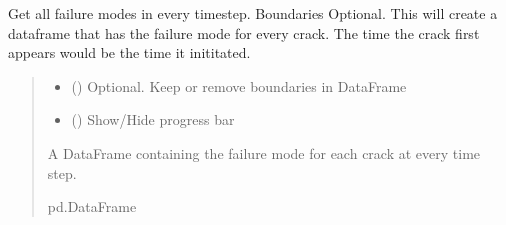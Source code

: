 \documentclass[letterpaper,10pt,english]{sphinxmanual}
\begin{document}
\begin{fulllineitems}
\begin{fulllineitems}
\begin{quote}
\begin{description}
\end{description}\end{quote}

\end{fulllineitems}


\begin{fulllineitems}
\label{\detokenize{pyfdempp:pyfdempp.pyfdempp.Model.crack_failure_mode}}
\pysigstartsignatures
{}
\pysigstopsignatures
\sphinxAtStartPar
Get all failure modes in every timestep. Boundaries Optional.
This will create a dataframe that has the failure mode for every crack. The time the crack first appears would be the time it inititated.
\begin{quote}\begin{description}
\begin{itemize}
\item {} 
\sphinxAtStartPar
{} () \textendash{} Optional. Keep or remove boundaries in DataFrame

\item {} 
\sphinxAtStartPar
{} () \textendash{} Show/Hide progress bar

\end{itemize}

\sphinxAtStartPar
A DataFrame containing the failure mode for each crack at every time step.

\sphinxAtStartPar
pd.DataFrame

\end{description}\end{quote}

\begin{sphinxVerbatim}[commandchars=\\\{\}]
   
  
  
\end{sphinxVerbatim}


\end{fulllineitems}
\end{fulllineitems}
\end{document}

